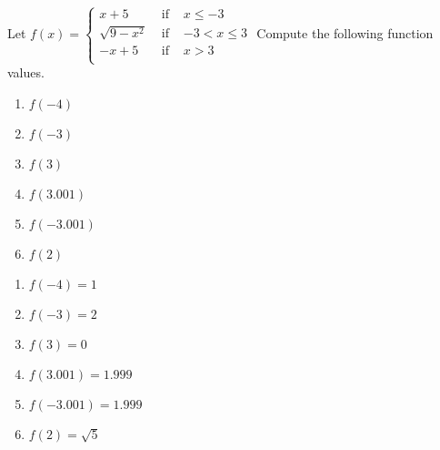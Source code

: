 {Let $f(x) = \left\{  \begin{array}{rcr} x + 5 & \mbox{ if } & x \leq -3 \\ \sqrt{9-x^2} & \mbox{ if } & -3 < x \leq 3 \\ -x+5 & \mbox{ if } & x > 3 \\ \end{array}        \right.$ Compute the following function values.

\begin{multicols}{2}
\begin{enumerate}
\item $f(-4)$
\item  $f(-3)$
\item  $f(3)$
\item  $f(3.001)$
\item  $f(-3.001)$
\item  $f(2)$
\end{enumerate}
\end{multicols}
}
{\begin{enumerate}
\item $f(-4) = 1$
\item  $f(-3) = 2$
\item  $f(3) = 0$
\item  $f(3.001) = 1.999$
\item  $f(-3.001) = 1.999$
\item  $f(2) = \sqrt{5}$
\end{enumerate}}